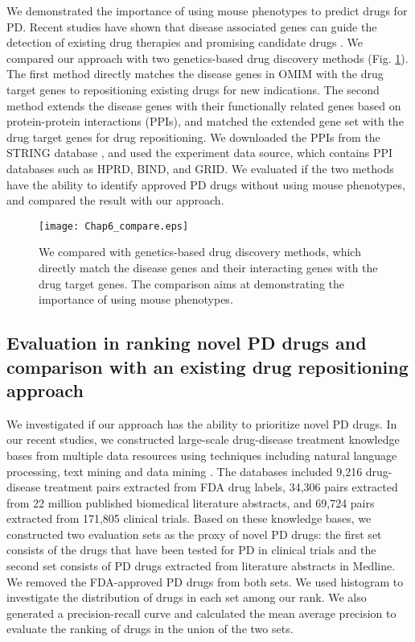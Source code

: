 We demonstrated the importance of using mouse phenotypes to predict drugs for PD. Recent studies have shown that disease associated genes can guide the detection of existing drug therapies and promising candidate drugs \cite{sanseau2012use,wang2013rational}.  We compared our approach with two genetics-based drug discovery methods (Fig. \ref{mphen_comp}). The first method \cite{wang2013rational} directly matches the disease genes in OMIM with the drug target genes to repositioning existing drugs for new indications. The second method \cite{okada2014genetics} extends the disease genes with their functionally related genes based on protein-protein interactions (PPIs), and matched the extended gene set with the drug target genes for drug repositioning. We downloaded the PPIs from the STRING database \cite{snel2000string}, and used the experiment data source, which contains PPI databases such as HPRD, BIND, and GRID. We evaluated if the two methods have the ability to identify approved PD drugs without using mouse phenotypes, and compared the result with our approach.
  \begin{figure}[h!]
  \begin{center}
\texttt{[image: Chap6\_compare.eps]}
\end{center}
  \caption{We compared with genetics-based drug discovery methods, which directly match the disease genes and their interacting genes with the drug target genes. The comparison aims at demonstrating the importance of using mouse phenotypes.}\label{mphen_comp}
  \end{figure}

\subsection{Evaluation in ranking novel PD drugs and comparison with an existing drug repositioning approach}
We investigated if our approach has the ability to prioritize novel PD drugs. In our recent studies, we constructed large-scale drug-disease treatment knowledge bases from multiple data resources using techniques including natural language processing, text mining and data mining \cite{xu2013large,xu2013semi}. The databases included 9,216 drug-disease treatment pairs extracted from FDA drug labels, 34,306 pairs extracted from 22 million published biomedical literature abstracts, and 69,724 pairs extracted from 171,805 clinical trials. Based on these knowledge bases, we constructed two evaluation sets as the proxy of novel PD drugs: the first set consists of the drugs that have been tested for PD in clinical trials and the second set consists of PD drugs extracted from literature abstracts in Medline. We removed the FDA-approved PD drugs from both sets. We used histogram to investigate the distribution of drugs in each set among our rank. We also generated a precision-recall curve and calculated the mean average precision to evaluate the ranking of drugs in the union of the two sets.

